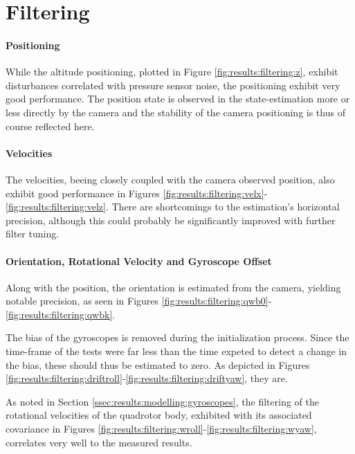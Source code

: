 \section{Filtering}
\paragraph{Positioning}
    While the altitude positioning, plotted in Figure \ref{fig:results:filtering:z},
    exhibit disturbances correlated with pressure sensor noise,
    the positioning exhibit very good performance. The position state
    is observed in the state-estimation more or less directly by the camera
    and the stability of the camera positioning is thus of course reflected here.

\paragraph{Velocities}
    The velocities, beeing closely coupled with the camera observed position,
    also exhibit good performance in Figures \ref{fig:results:filtering:velx}-\ref{fig:results:filtering:velz}.
    There are shortcomings to the estimation's horizontal precision, although
    this could probably be significantly improved with further filter tuning.

\paragraph{Orientation, Rotational Velocity and Gyroscope Offset}
    Along with the position, the orientation is estimated from the camera,
    yielding notable precision, as seen in Figures
    \ref{fig:results:filtering:qwb0}-\ref{fig:results:filtering:qwbk}.

    The bias of the gyroscopes is removed during the initialization process.
    Since the time-frame of the tests were far less than the time expeted to
    detect a change in the bias, these should thus be estimated to zero.
    As depicted in Figures \ref{fig:results:filtering:driftroll}-\ref{fig:results:filtering:driftyaw}, they are.

    As noted in Section \ref{ssec:results:modelling:gyroscopes}, the
    filtering of the rotational velocities of the quadrotor body,
    exhibited with its associated covariance in Figures \ref{fig:results:filtering:wroll}-\ref{fig:results:filtering:wyaw},
    correlates very well to the measured results.

